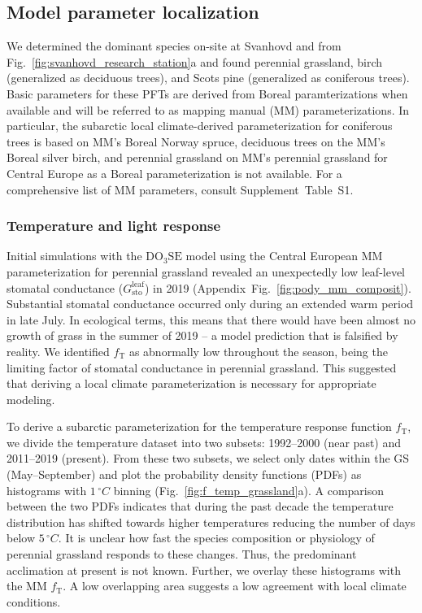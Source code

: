 \documentclass[bg, manuscript]{copernicus}
\begin{document}
\subsection{Model parameter localization}
\label{sec:localization}

We determined the dominant species on-site at Svanhovd and from Fig.~\ref{fig:svanhovd_research_station}a and found perennial grassland, birch (generalized as deciduous trees), and Scots pine (generalized as coniferous trees). Basic parameters for these PFTs are derived from Boreal paramterizations when available \citep{EP:Simpson2007,GCB:Mills2011,ICP:MappingManual2017} and will be referred to as mapping manual (MM) parameterizations. In particular, the subarctic local climate-derived parameterization for coniferous trees is based on MM's Boreal Norway spruce, deciduous trees on the MM's Boreal silver birch, and perennial grassland on MM's perennial grassland for Central Europe as a Boreal parameterization is not available. For a comprehensive list of MM parameters, consult Supplement~Table~S1.

\subsubsection{Temperature and light response}

Initial simulations with the $\mathrm{DO_3SE}$ model using the Central European MM parameterization for perennial grassland revealed an unexpectedly low leaf-level stomatal conductance ($G_\mathrm{sto}^\mathrm{leaf}$) in 2019 (Appendix~Fig.~\ref{fig:pody_mm_composit}). Substantial stomatal conductance occurred only during an extended warm period in late July. In ecological terms, this means that there would have been almost no growth of grass in the summer of 2019 -- a model prediction that is falsified by reality. We identified $f_\mathrm{T}$ as abnormally low throughout the season, being the limiting factor of stomatal conductance in perennial grassland. This suggested that deriving a local climate parameterization is necessary for appropriate modeling.

To derive a subarctic parameterization for the temperature response function $f_\mathrm{T}$, we divide the temperature dataset into two subsets: 1992--2000 (near past) and 2011--2019 (present). From these two subsets, we select only dates within the GS (May--September) and plot the probability density functions (PDFs) as histograms with $1\,\unit{^\circ C}$ binning (Fig.~\ref{fig:f_temp_grassland}a). A comparison between the two PDFs indicates that during the past decade the temperature distribution has shifted towards higher temperatures reducing the number of days below $5\,\unit{^\circ C}$. It is unclear how fast the species composition or physiology of perennial grassland responds to these changes. Thus, the predominant acclimation at present is not known. Further, we overlay these histograms with the MM $f_\mathrm{T}$. A low overlapping area suggests a low agreement with local climate conditions. 
\end{document}
